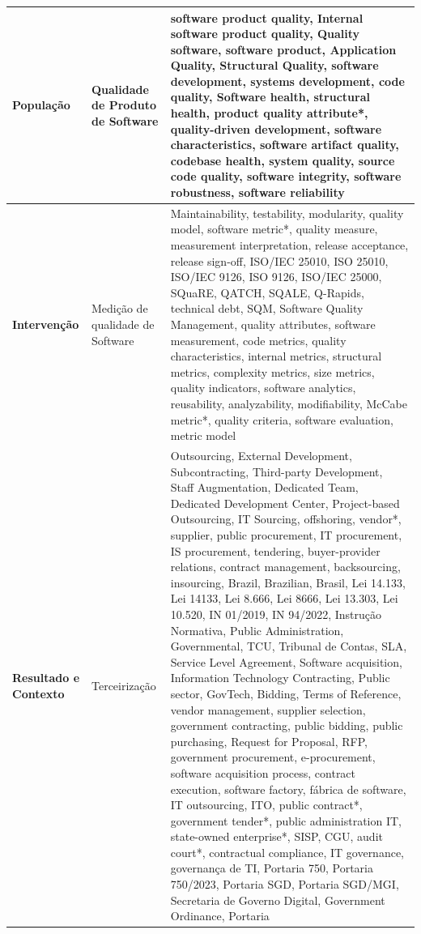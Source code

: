 \begin{longtable}{|p{2.5cm}|p{3.5cm}|p{8.6cm}|}
    \textbf{População} & Qualidade de Produto de Software & software product quality, Internal software product quality, Quality software, software product, Application Quality, Structural Quality, software development, systems development, code quality, Software health, structural health, product quality attribute*, quality-driven development, software characteristics, software artifact quality, codebase health, system quality, source code quality, software integrity, software robustness, software reliability \\
    \hline
    \textbf{Intervenção} & Medição de qualidade de Software & Maintainability, testability, modularity, quality model, software metric*, quality measure, measurement interpretation, release acceptance, release sign-off, ISO/IEC 25010, ISO 25010, ISO/IEC 9126, ISO 9126, ISO/IEC 25000, SQuaRE, QATCH, SQALE, Q-Rapids, technical debt, SQM, Software Quality Management, quality attributes, software measurement, code metrics, quality characteristics, internal metrics, structural metrics, complexity metrics, size metrics, quality indicators, software analytics, reusability, analyzability, modifiability, McCabe metric*, quality criteria, software evaluation, metric model \\
    \hline
    \textbf{Resultado e Contexto} & Terceirização & Outsourcing, External Development, Subcontracting, Third-party Development, Staff Augmentation, Dedicated Team, Dedicated Development Center, Project-based Outsourcing, IT Sourcing, offshoring, vendor*, supplier, public procurement, IT procurement, IS procurement, tendering, buyer-provider relations, contract management, backsourcing, insourcing, Brazil, Brazilian, Brasil, Lei 14.133, Lei 14133, Lei 8.666, Lei 8666, Lei 13.303, Lei 10.520, IN 01/2019, IN 94/2022, Instrução Normativa, Public Administration, Governmental, TCU, Tribunal de Contas, SLA, Service Level Agreement, Software acquisition, Information Technology Contracting, Public sector, GovTech, Bidding, Terms of Reference, vendor management, supplier selection, government contracting, public bidding, public purchasing, Request for Proposal, RFP, government procurement, e-procurement, software acquisition process, contract execution, software factory, fábrica de software, IT outsourcing, ITO, public contract*, government tender*, public administration IT, state-owned enterprise*, SISP, CGU, audit court*, contractual compliance, IT governance, governança de TI, Portaria 750, Portaria 750/2023, Portaria SGD, Portaria SGD/MGI, Secretaria de Governo Digital, Government Ordinance, Portaria \\
\end{longtable}

